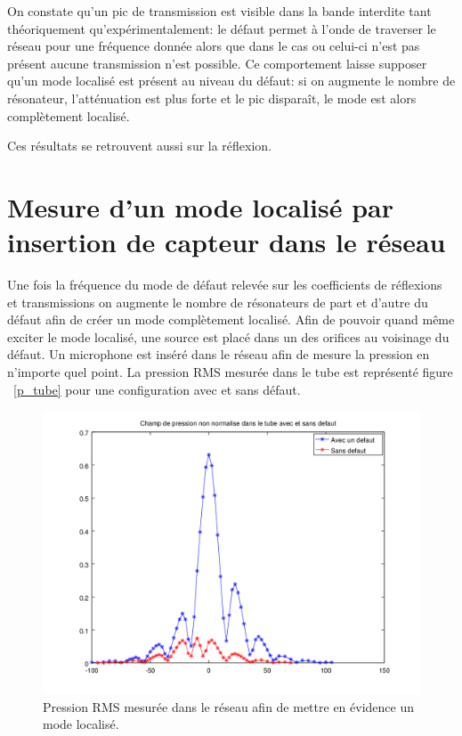 On constate qu'un pic de transmission est visible dans la bande interdite tant théoriquement qu'expérimentalement: le défaut permet à l'onde de traverser le réseau pour une fréquence donnée alors que dans le cas ou celui-ci n'est pas présent aucune transmission n'est possible. Ce comportement laisse supposer qu'un mode localisé est présent au niveau du défaut: si on augmente le nombre de résonateur, l'atténuation est plus forte et le pic disparaît, le mode est alors complètement localisé.

Ces résultats se retrouvent aussi sur la réflexion.
%

\section{Mesure d'un mode localisé par insertion de capteur dans le réseau}



Une fois la fréquence du mode de défaut relevée sur les coefficients de réflexions et transmissions on augmente le nombre de résonateurs de part et d'autre du défaut afin de créer un mode complètement localisé. Afin de pouvoir quand même exciter le mode localisé, une source est placé dans un des orifices au voisinage du défaut. Un microphone est inséré dans le réseau afin de mesure la pression en n'importe quel point. La pression RMS mesurée dans le tube est représenté figure ~\ref{p_tube} pour une configuration avec et sans défaut.

\begin{figure}[!h]
\centering
\includegraphics[scale=0.5]{./images_chp3/non_norm_lin.png}
\caption{\label{_tube} Pression RMS mesurée dans le réseau afin de mettre en évidence un mode localisé.}
\end{figure}

